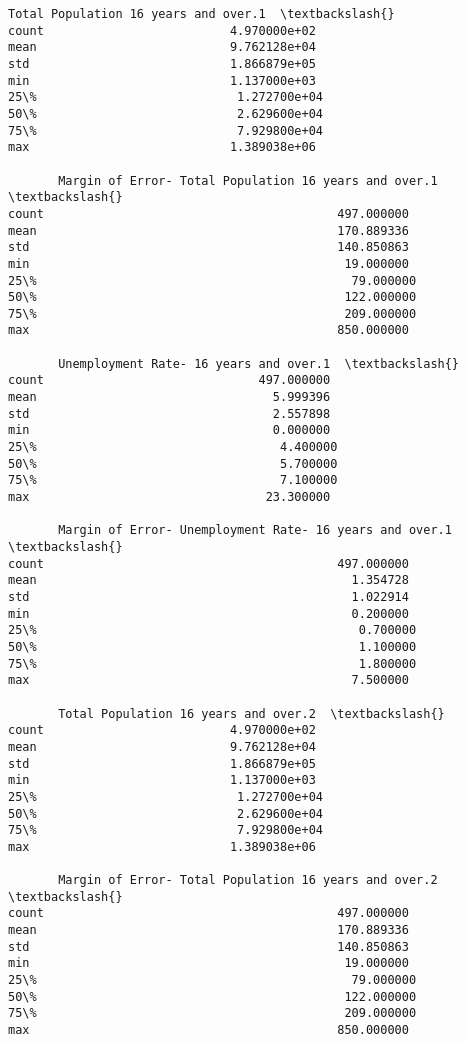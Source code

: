 \documentclass[11pt]{article}
\begin{document}
\begin{tcolorbox}[breakable, size=fbox, boxrule=.5pt, pad at break*=1mm, opacityfill=0]
\begin{Verbatim}[commandchars=\\\{\}]
       Total Population 16 years and over.1  \textbackslash{}
count                          4.970000e+02
mean                           9.762128e+04
std                            1.866879e+05
min                            1.137000e+03
25\%                            1.272700e+04
50\%                            2.629600e+04
75\%                            7.929800e+04
max                            1.389038e+06

       Margin of Error- Total Population 16 years and over.1  \textbackslash{}
count                                         497.000000
mean                                          170.889336
std                                           140.850863
min                                            19.000000
25\%                                            79.000000
50\%                                           122.000000
75\%                                           209.000000
max                                           850.000000

       Unemployment Rate- 16 years and over.1  \textbackslash{}
count                              497.000000
mean                                 5.999396
std                                  2.557898
min                                  0.000000
25\%                                  4.400000
50\%                                  5.700000
75\%                                  7.100000
max                                 23.300000

       Margin of Error- Unemployment Rate- 16 years and over.1  \textbackslash{}
count                                         497.000000
mean                                            1.354728
std                                             1.022914
min                                             0.200000
25\%                                             0.700000
50\%                                             1.100000
75\%                                             1.800000
max                                             7.500000

       Total Population 16 years and over.2  \textbackslash{}
count                          4.970000e+02
mean                           9.762128e+04
std                            1.866879e+05
min                            1.137000e+03
25\%                            1.272700e+04
50\%                            2.629600e+04
75\%                            7.929800e+04
max                            1.389038e+06

       Margin of Error- Total Population 16 years and over.2  \textbackslash{}
count                                         497.000000
mean                                          170.889336
std                                           140.850863
min                                            19.000000
25\%                                            79.000000
50\%                                           122.000000
75\%                                           209.000000
max                                           850.000000


\end{Verbatim}
\end{tcolorbox}
\end{document}
